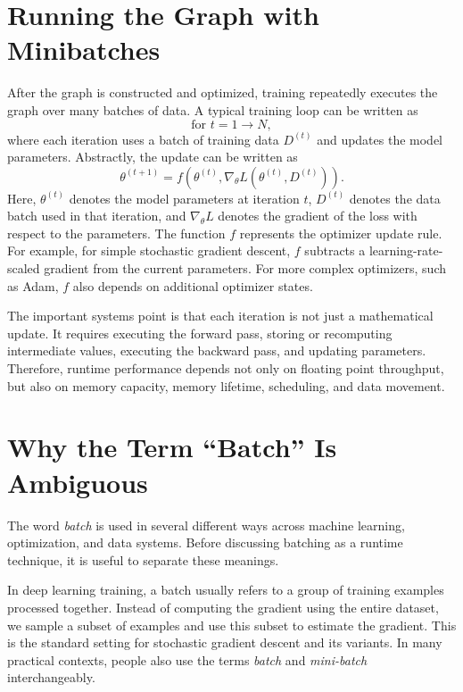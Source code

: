 \section{Running the Graph with Minibatches}

After the graph is constructed and optimized, training repeatedly executes the graph over many batches of data. A typical training loop can be written as
\[
    \text{for } t = 1 \rightarrow N,
\]
where each iteration uses a batch of training data $D^{(t)}$ and updates the model parameters. Abstractly, the update can be written as
\[
    \theta^{(t+1)}
    =
    f\left(\theta^{(t)}, \nabla_{\theta} L\left(\theta^{(t)}, D^{(t)}\right)\right).
\]
Here, $\theta^{(t)}$ denotes the model parameters at iteration $t$, $D^{(t)}$ denotes the data batch used in that iteration, and $\nabla_{\theta} L$ denotes the gradient of the loss with respect to the parameters. The function $f$ represents the optimizer update rule. For example, for simple stochastic gradient descent, $f$ subtracts a learning-rate-scaled gradient from the current parameters. For more complex optimizers, such as Adam, $f$ also depends on additional optimizer states.

The important systems point is that each iteration is not just a mathematical update. It requires executing the forward pass, storing or recomputing intermediate values, executing the backward pass, and updating parameters. Therefore, runtime performance depends not only on floating point throughput, but also on memory capacity, memory lifetime, scheduling, and data movement.

\section{Why the Term ``Batch'' Is Ambiguous}

The word \emph{batch} is used in several different ways across machine learning, optimization, and data systems. Before discussing batching as a runtime technique, it is useful to separate these meanings.

In deep learning training, a batch usually refers to a group of training examples processed together. Instead of computing the gradient using the entire dataset, we sample a subset of examples and use this subset to estimate the gradient. This is the standard setting for stochastic gradient descent and its variants. In many practical contexts, people also use the terms \emph{batch} and \emph{mini-batch} interchangeably.

